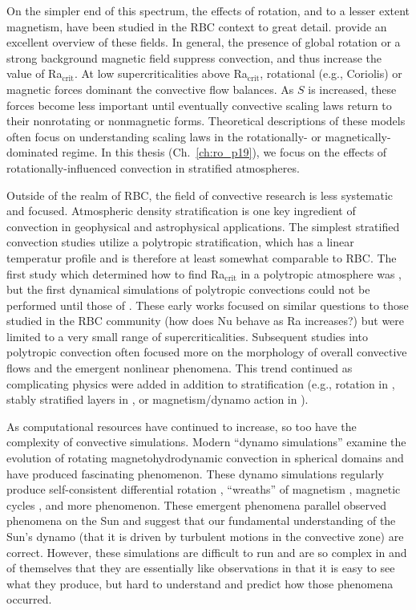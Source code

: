 On the simpler end of this spectrum, the effects of rotation, and to a lesser extent magnetism, have been studied in the RBC context to great detail.
\citet{plumley&julien2019} provide an excellent overview of these fields.
In general, the presence of global rotation or a strong background magnetic field suppress convection, and thus increase the value of Ra$_{\text{crit}}$.
At low supercriticalities above Ra$_{\text{crit}}$, rotational (e.g., Coriolis) or magnetic forces dominant the convective flow balances.
As $S$ is increased, these forces become less important until eventually convective scaling laws return to their nonrotating or nonmagnetic forms.
Theoretical descriptions of these models often focus on understanding scaling laws in the rotationally- \citep[e.g.,][]{julien&all2012} or magnetically- \citep[e.g.,][]{cioni&all2000} dominated regime.
In this thesis (Ch.~\ref{ch:ro_p19}), we focus on the effects of rotationally-influenced convection in stratified atmospheres.

Outside of the realm of RBC, the field of convective research is less systematic and focused.
Atmospheric density stratification is one key ingredient of convection in geophysical and astrophysical applications.
The simplest stratified convection studies utilize a polytropic stratification, which has a linear temperatur profile and is therefore at least somewhat comparable to RBC.
The first study which determined how to find Ra$_{\text{crit}}$ in a polytropic atmosphere was \citet{unnoetall1960}, but the first dynamical simulations of polytropic convections could not be performed until those of \citet{graham1975}.
These early works focused on similar questions to those studied in the RBC community (how does Nu behave as Ra increases?) but were limited to a very small range of supercriticalities.
Subsequent studies into polytropic convection \citep[e.g.,][]{hurlburt&all1984, cattaneo&all1991} often focused more on the morphology of overall convective flows and the emergent nonlinear phenomena.
This trend continued as complicating physics were added in addition to stratification (e.g., rotation in \citet{brummell&all1996, brummell&all1998}, stably stratified layers in \citet{hurlburt&all1986, singh&all1995, brummell&all2002}, or magnetism/dynamo action in \citep{nordlund&all1992, brandenburg&all1996, tobias&all1998}).

As computational resources have continued to increase, so too have the complexity of convective simulations.
Modern ``dynamo simulations'' examine the evolution of rotating magnetohydrodynamic convection in spherical domains and have produced fascinating phenomenon.
These dynamo simulations regularly produce self-consistent differential rotation \citep{strugarek&all2018}, ``wreaths'' of magnetism \citep{brown&all2010}, magnetic cycles \citep{brown&all2011}, and more phenomenon.
These emergent phenomena parallel observed phenomena on the Sun and suggest that our fundamental understanding of the Sun's dynamo (that it is driven by turbulent motions in the convective zone) are correct.
However, these simulations are difficult to run and are so complex in and of themselves that they are essentially like observations in that it is easy to see what they produce, but hard to understand and predict how those phenomena occurred.

